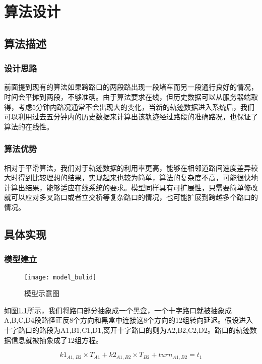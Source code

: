 \chapter{算法设计}
\label{chap3}

\section{算法描述}

\subsection{设计思路}

前面提到现有的算法如果跨路口的两段路出现一段堵车而另一段通行良好的情况，时间会平摊到两段，不够准确。由于算法要求在线，但历史数据可以从服务器端取得，考虑5分钟内路况通常不会出现大的变化，当新的轨迹数据进入系统后，我们可以利用过去五分钟内的历史数据来计算出该轨迹经过路段的准确路况，也保证了算法的在线性。

\subsection{算法优势}

相对于平滑算法，我们对于轨迹数据的利用率更高，能够在相邻道路间速度差异较大时得到比较理想的结果，实现起来也较为简单，算法的复杂度不高，可能很快地计算出结果，能够适应在线系统的要求。模型同样具有可扩展性，只需要简单修改就可以应对多叉路口或者立交桥等复杂路口的情况，也可能扩展到跨越多个路口的情况。

\section{具体实现}

\subsection{模型建立}

\begin{figure}[H] 
  \centering
  \texttt{[image: model\_bulid]}
  \caption{模型示意图}
  \label{fig:3.1}
\end{figure}

如图\ref{fig:3.1}所示，我们将路口部分抽象成一个黑盒，一个十字路口就被抽象成A,B,C,D4段路径正反8个方向和黑盒中连接这8个方向的12组转向延迟。假设进入十字路口的路段为A1,B1,C1,D1,离开十字路口的则为A2,B2,C2,D2。路口的轨迹数据信息就被抽象成了12组方程。

\begin{equation}
k1_{A1,B2} \times T_{A1} + k2_{A1,B2} \times T_{B2} + turn_{A1,B2} = t_{1}
\end{equation}

